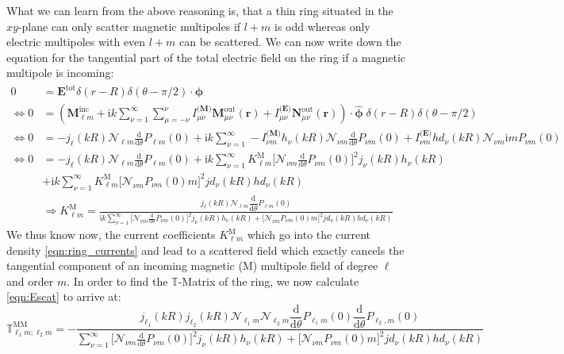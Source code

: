 \documentclass[a4paper,12pt]{scrartcl}  %
\newcommand{\unitv}[1]{\hat{\bm{#1}}}
\newcommand{\imag}{\mathrm{i}}
\newcommand{\rd}{\mathrm{d}}
\begin{document}
What we can learn from the above reasoning is, that a thin ring situated in the $xy$-plane can only scatter magnetic multipoles if $l+m$ is odd whereas only electric multipoles with even $l+m$ can be scattered.
We can now write down the equation for the tangential part of the total electric field on the ring if a magnetic multipole is incoming:
\begin{align}
0&=\mathbf{E}^\mathrm{tot}\delta(r-R)\delta(\theta-\pi/2)\cdot \unitv{\phi} \\
\nonumber
\Leftrightarrow 0&=\left(\mathbf{M}^\mathrm{inc}_{\ell m} + \imag k \sum_{\nu=1}^\infty  \sum_{\mu=-\nu}^\nu
I_{\mu \nu}^\textbf{(M)}\mathbf{M}^\mathrm{out}_{\mu \nu}(\mathbf{r})+
I_{\mu \nu}^\textbf{(E)}\mathbf{N}^\mathrm{out}_{\mu \nu}(\mathbf{r})\right) \cdot \unitv{\phi}
\;\delta(r-R)\delta(\theta-\pi/2)\\
\nonumber
\Leftrightarrow 0&=
-j_\ell(kR)\mathcal{N}_{\ell m}\frac{\rd}{\rd\theta}P_{\ell m}(0) 
+
\imag k \sum_{\nu=1}^\infty  
-I_{\nu m}^\textbf{(M)}
h_\nu(kR)\mathcal{N}_{\nu m}\frac{\rd}{\rd\theta}P_{\nu m}(0) 
+
I_{\nu m}^\textbf{(E)}
hd_\nu(kR)\mathcal{N}_{\nu m}\imag m  P_{\nu m}(0) \\ \nonumber
\Leftrightarrow
0 &= -j_\ell(kR)\mathcal{N}_{\ell m}\frac{\rd}{\rd\theta}P_{\ell m}(0) 
+ \imag k\sum_{\nu = 1}^\infty
K^\mathrm{M}_{\ell m}\Big[
\mathcal{N}_{\nu m} \frac{\rd}{\rd \theta}P_{\nu m}(0)
\Big]^2 j_\nu(kR) h_\nu(kR)
\\ \nonumber
&+ \imag k\sum_{\nu = 1}^\infty
K^\mathrm{M}_{\ell m} \Big[
\mathcal{N}_{\nu m} P_{\nu m}(0) m
\Big]^2jd_\nu(kR) hd_\nu(kR)
\\ \nonumber
&\Rightarrow K^\mathrm{M}_{\ell m} = \frac{j_\ell(kR) \mathcal{N}_{\ell m}\dfrac{\rd}{\rd \theta}P_{\ell m}(0)}{\imag k \displaystyle \sum_{\nu=1}^\infty
\Big[
\mathcal{N}_{\nu m} \frac{\rd}{\rd \theta}P_{\nu m}(0)
\Big]^2 j_\nu(kR) h_\nu(kR)
+
\Big[
\mathcal{N}_{\nu m} P_{\nu m}(0) m
\Big]^2jd_\nu(kR) hd_\nu(kR)
}
\end{align}
We thus know now, the current coefficients $K^\mathrm{M}_{\ell m}$ which go into the current density \cref{eqn:ring_currents} and lead to a scattered field which exactly cancels the tangential component of an incoming magnetic (M) multipole field of degree $\ell$ and order $m$. In order to
find the $\mathbb{T}$-Matrix of the ring, we now calculate \cref{eqn:Escat} to arrive at:
\begin{equation}
\mathbb{T}^\mathrm{MM}_{\ell_1 m;\ell_2 m} = -
\frac{j_{\ell_1}(kR)j_{\ell_2}(kR) \mathcal{N}_{\ell_1 m}\mathcal{N}_{\ell_2 m}
\dfrac{\rd}{\rd \theta}P_{\ell_1 m}(0)\dfrac{\rd}{\rd \theta}P_{\ell_2,m}(0)}{\displaystyle \sum_{\nu=1}^\infty
\Big[
\mathcal{N}_{\nu m} \frac{\rd}{\rd \theta}P_{\nu m}(0)
\Big]^2 j_\nu(kR) h_\nu(kR)
+
\Big[
\mathcal{N}_{\nu m} P_{\nu m}(0) m
\Big]^2jd_\nu(kR) hd_\nu(kR)
}
\end{equation}
\end{document}

